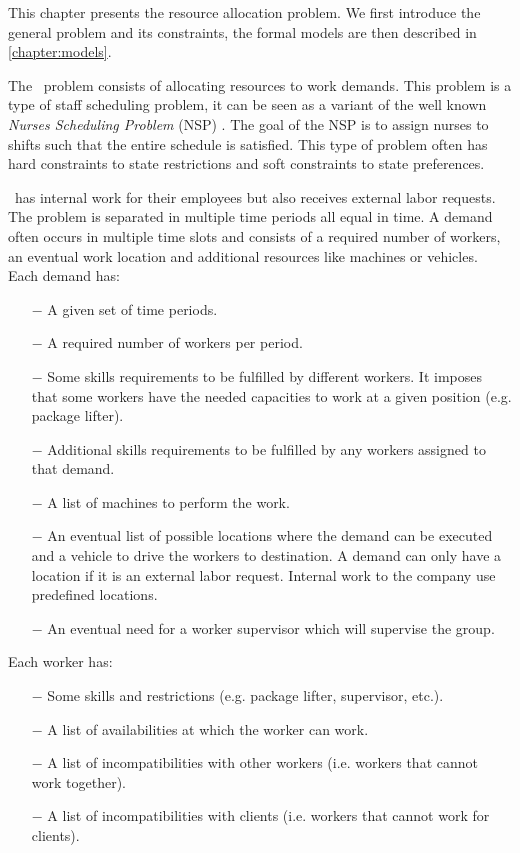 \documentclass[../thesis.tex]{subfiles}
\begin{document}
This chapter presents the resource allocation problem.
We first introduce the general problem and its constraints, 
the formal models are then described in \autoref{chapter:models}.

The \vone\ problem consists of allocating resources to work demands.
This problem is a type of staff scheduling problem, it can be seen as a variant of the 
well known \emph{Nurses Scheduling Problem} (NSP) \cite{Burke2004}. The goal of the NSP is to assign 
nurses to shifts such that the entire schedule is satisfied. 
This type of problem often has hard constraints to state restrictions 
and soft constraints to state preferences. 

\vone\ has internal work for their employees but also receives 
external labor requests. The problem is separated in multiple time periods all equal in time.
A demand often occurs in multiple time slots and consists of a required number of workers, an eventual 
work location and additional resources like machines or vehicles. Each demand has:

\begin{itemize}
  \item[$-$] A given set of time periods.
  \item[$-$] A required number of workers per period.
  \item[$-$] Some skills requirements to be fulfilled by different workers. 
  It imposes that some workers have the needed capacities to work at a given position (e.g. package lifter).
  \item[$-$] Additional skills requirements to be fulfilled by any workers assigned to that demand.
  \item[$-$] A list of machines to perform the work.
  \item[$-$] An eventual list of possible locations where the demand can be executed and a vehicle to drive the workers to destination.
  A demand can only have a location if it is an external labor request. Internal work to the company use predefined locations.
  \item[$-$] An eventual need for a worker supervisor which will supervise the group.
\end{itemize}


Each worker has:

\begin{itemize}
  \item[$-$] Some skills and restrictions (e.g. package lifter, supervisor, etc.).
  \item[$-$] A list of availabilities at which the worker can work.
  \item[$-$] A list of incompatibilities with other workers (i.e. workers that cannot work together).
  \item[$-$] A list of incompatibilities with clients (i.e. workers that cannot work for clients).
\end{itemize}
\end{document}
